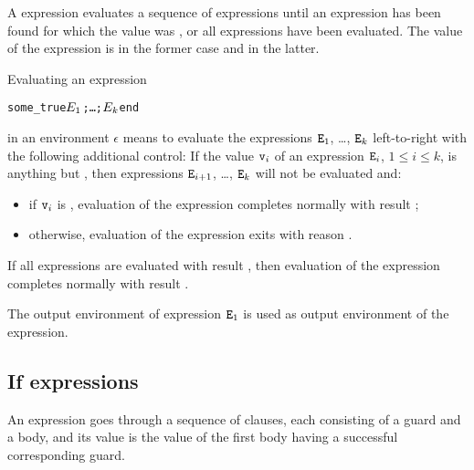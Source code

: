 \label{section:sometrue-exprs}

A  expression evaluates a sequence of expressions until
an expression has been found for which the value was
, or all expressions have been evaluated.  The value of
the  expression is  in the former case and
 in the latter.

\SYNTAX

\begin{rules}
\ifStd
{}
       {  }
\fi
\end{rules}

\EVALUATION

Evaluating an expression
\begin{alltt}
some_true \(\Z{E}\sb{1}\) ; \ldots ; \(\Z{E}\sb{k}\) end
\end{alltt}
in an environment $\epsilon$ means to evaluate the expressions
${\tt{\sl E}}_1$, \ldots, ${\tt{\sl E}}_k$ left-to-right with the following
additional control:
If the value ${\tt{\sl v}}_i$ of an expression ${\tt{\sl E}}_i$, $1\leq i\leq k$, is
anything but , then
expressions ${\tt{\sl E}}_{i+1}$, \ldots, ${\tt{\sl E}}_k$ will not be evaluated and:
\begin{itemize}
\item if ${\tt{\sl v}}_i$ is , evaluation of the  expression
completes normally with result ;
\item otherwise, evaluation of the  expression exits
with reason .
\end{itemize}
If all expressions are evaluated with result , then
evaluation of the  expression
completes normally with result .

\ENVIRONMENTS

The output environment of expression ${\tt{\sl E}}_1$ is used as output environment of
the  expression.
\fi %

\subsection{If expressions}

\label{section:if-expr}

An  expression goes through a sequence of clauses, each
consisting of a guard and a body, and its value is the value of the
first body having a successful corresponding guard.

